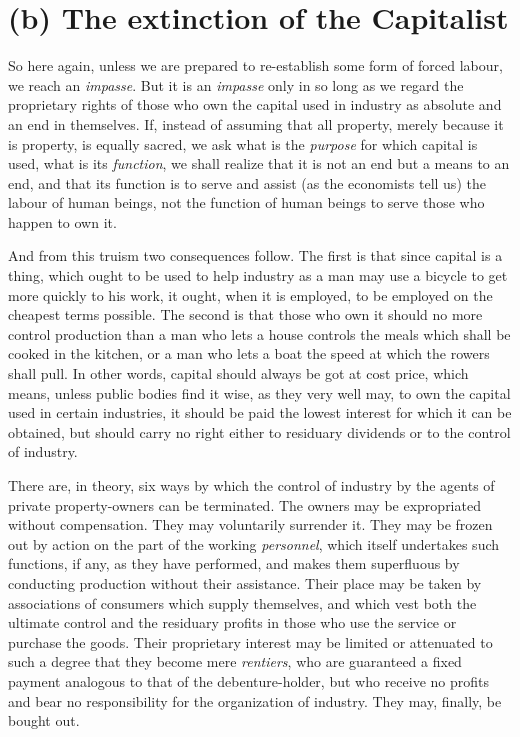 \documentclass{book}
\begin{document}
\section{(b) The extinction of the Capitalist}
So here again, unless we are prepared to re-establish some form of forced labour, we reach an \emph{impasse}. But it is an \emph{impasse} only in so long as we regard the proprietary rights of those who own the capital used in industry as absolute and an end in themselves. If, instead of assuming that all property, merely because it is property, is equally sacred, we ask what is the \emph{purpose} for which capital is used, what is its \emph{function}, we shall realize that it is not an end but a means to an end, and that its function is to serve and assist (as the economists tell us) the labour of human beings, not the function of human beings to serve those who happen to own it.

And from this truism two consequences follow. The first is that since capital is a thing, which ought to be used to help industry as a man may use a bicycle to get more quickly to his work, it ought, when it is employed, to be employed on the cheapest terms possible. The second is that those who own it should no more control production than a man who lets a house controls the meals which shall be cooked in the kitchen, or a man who lets a boat the speed at which the rowers shall pull. In other words, capital should always be got at cost price, which means, unless public bodies find it wise, as they very well may, to own the capital used in certain industries, it should be paid the lowest interest for which it can be obtained, but should carry no right either to residuary dividends or to the control of industry.

There are, in theory, six ways by which the control of industry by the agents of private property-owners can be terminated. The owners may be expropriated without compensation. They may voluntarily surrender it. They may be frozen out by action on the part of the working \emph{personnel}, which itself undertakes such functions, if any, as they have performed, and makes them superfluous by conducting production without their assistance. Their place may be taken by associations of consumers which supply themselves, and which vest both the ultimate control and the residuary profits in those who use the service or purchase the goods. Their proprietary interest may be limited or attenuated to such a degree that they become mere \emph{rentiers}, who are guaranteed a fixed payment analogous to that of the debenture-holder, but who receive no profits and bear no responsibility for the organization of industry. They may, finally, be bought out.
\end{document}
